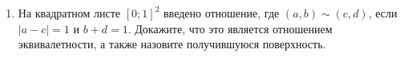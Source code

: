 \begin{enumerate}
.
\item На квадратном листе $[0;1]^2$ введено отношение, где $(a, b) \sim (c, d)$, если $|a-c| = 1$ и $b + d = 1$. Докажите, что это является отношением эквивалетности, а также назовите получившуюся поверхность.
\end{enumerate}
